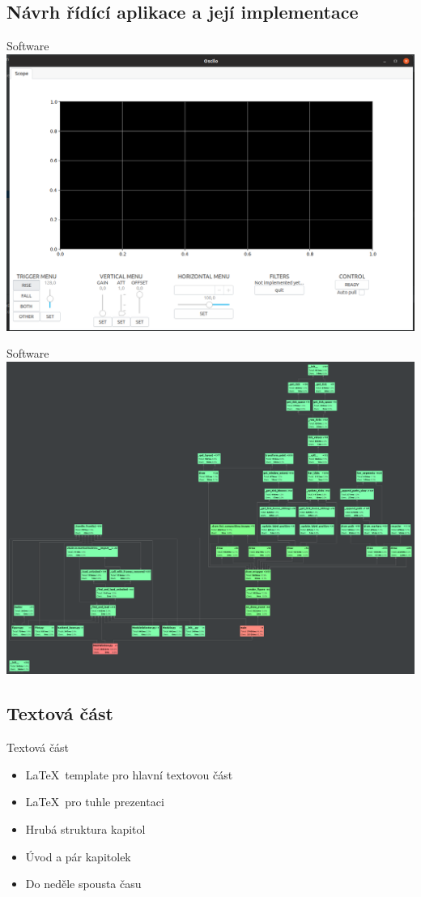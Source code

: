 \documentclass{beamer}
\begin{document}
	\subsection{Návrh řídící aplikace a její implementace}
		\begin{frame}{Software}
			\includegraphics[width=\paperwidth]{oscilo_fake.png}
		\end{frame}
		\begin{frame}{Software}
			\includegraphics[width=\paperwidth]{profile_fake.png}
		\end{frame}
	\subsection{Textová část}
		\begin{frame}{Textová část}
			\begin{itemize}
				\item \LaTeX\ template pro hlavní textovou část
				\item \LaTeX\  pro tuhle prezentaci
				\item Hrubá struktura kapitol
				\item Úvod a pár kapitolek
				\item Do neděle spousta času
			\end{itemize}		
		\end{frame}
\end{document}
